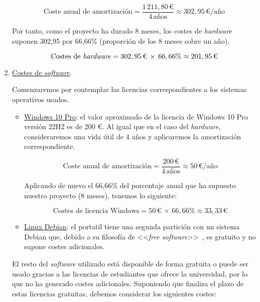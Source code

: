 \begin{enumerate}
        \[
        \text{{Coste anual de amortización}} = \frac{{1\,211,80  \, \text{{€}}}}{{4 \, \text{{años}}}} \approx 302,95 \, \text{{€/año}}
        \]

    Por tanto, como el proyecto ha durado 8 meses, los costes de \textit{hardware} suponen 302,95 por 66,66\% (proporción de los 8 meses sobre un año).

        \[
        \text{{Costes de \textit{hardware}}} = 302,95 \,\text{{€}} \, \times \, 66,66\% \approx 201,95 \, \text{{€}}
        \]
    \newline


    \item \underline{Costes de \textit{software}}.
    
    Comenzaremos por contemplar las licencias correspondientes a los sistemas operativos usados.

    \begin{itemize}
        \item \underline{Windows 10 Pro}: el valor aproximado de la licencia de Windows 10 Pro versión 22H2 es de 200 €. Al igual que en el caso del \textit{hardware}, consideraremos una vida útil de 4 años y aplicaremos la amortización correspondiente.

        \[
        \text{{Coste anual de amortización}} = \frac{{200 \, \text{{€}}}}{{4 \, \text{{años}}}} \approx 50 \, \text{{€/año}}
        \]

        Aplicando de nuevo el 66,66\% del porcentaje anual que ha supuesto nuestro proyecto (8 meses), tenemos lo siguiente:

        \[
        \text{{Costes de licencia Windows}} = 50 \,\text{{€}} \, \times \, 66,66\% \approx 33,33 \, \text{{€}}
        \]
        
        \item \underline{Linux Debian}: el portatil tiene una segunda partición con un sistema Debian que, debido a su filosofía de <<\textit{free software}>>~\cite{Debian}, es gratuito y no supone costes adicionales.
    \end{itemize}

    El resto del \textit{software} utilizado está disponible de forma gratuita o puede ser usado gracias a las licencias de estudiantes que ofrece la universidad, por lo que no ha generado costes adicionales. Suponiendo que finaliza el plazo de estas licencias gratuitas, debemos considerar los siguientes costes:


\end{enumerate}
